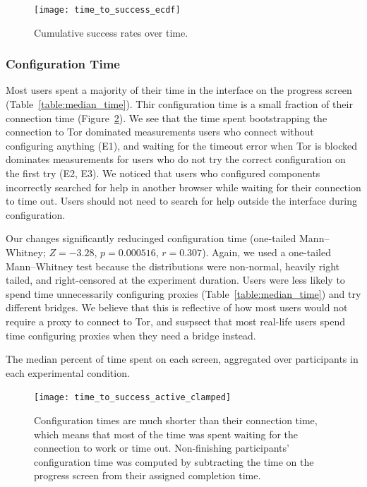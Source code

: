 \documentclass[USenglish,oneside,twocolumn]{article}
\begin{document}
\begin{figure}[t]
\centering
\texttt{[image: time\_to\_success\_ecdf]}
%
\caption{
Cumulative success rates over time.
}
\label{fig:time_to_success_ecdf}
\end{figure}


\subsubsection{Configuration Time} 
Most users spent a majority of their time in the interface on the progress screen (Table~\ref{table:median_time}). Thir configuration time is a small fraction of their connection time (Figure~\ref{fig:time_to_success_active_clamped}). We see that the time spent bootstrapping the connection to Tor dominated measurements users who connect without configuring anything (E1), and waiting for the timeout error when Tor is blocked dominates measurements for users who do not try the correct configuration on the first try (E2, E3). We noticed that users who configured components incorrectly searched for help in another browser while waiting for their connection to time out. Users should not need to search for help outside the interface during configuration.  

Our changes significantly reducinged configuration time (one-tailed Mann--Whitney; $Z = -3.28$, $p = 0.000516$, $r = 0.307$). Again, we used a one-tailed Mann--Whitney test because the distributions were non-normal, heavily right tailed, and right-censored at the experiment duration. Users were less likely to spend time unnecessarily configuring proxies (Table~\ref{table:median_time}) and try different bridges. We believe that this is reflective of how most users would not require a proxy to connect to Tor, and suspsect that most real-life users spend time configuring proxies when they need a bridge instead. 

\begin{table}[t]
\centering

\caption{
The median percent of time spent on each screen, aggregated over participants in each experimental condition.}
\label{table:median_time}
\end{table}

\begin{figure}[t]
\centering
\texttt{[image: time\_to\_success\_active\_clamped]}
\caption{
Configuration times are much shorter than their connection time, which means that most of the time was spent waiting for the connection to work or time out. Non-finishing participants' configuration time was computed by subtracting the time on the progress screen from their assigned completion time.
}
\label{fig:time_to_success_active_clamped}
\end{figure}
\end{document}
